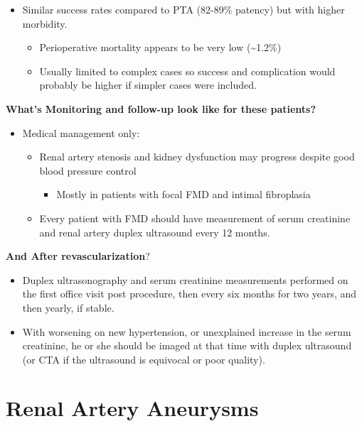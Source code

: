 \documentclass[
]{book}
\providecommand{\tightlist}{%
  \setlength{\itemsep}{0pt}\setlength{\parskip}{0pt}}
\begin{document}
\begin{itemize}
\item
  Similar success rates compared to PTA (82-89\% patency) but with
  higher morbidity.

  \begin{itemize}
  \item
    Perioperative mortality appears to be very low (\textasciitilde1.2\%)
  \item
    Usually limited to complex cases so success and complication
    would probably be higher if simpler cases were included.
  \end{itemize}
\end{itemize}

\textbf{What's Monitoring and follow-up look like for these patients?}

\begin{itemize}
\item
  Medical management only:

  \begin{itemize}
  \item
    Renal artery stenosis and kidney dysfunction may progress
    despite good blood pressure control

    \begin{itemize}
    \tightlist
    \item
      Mostly in patients with focal FMD and intimal fibroplasia
    \end{itemize}
  \item
    Every patient with FMD should have measurement of serum
    creatinine and renal artery duplex ultrasound every 12 months.
  \end{itemize}
\end{itemize}

\textbf{And After revascularization}?

\begin{itemize}
\item
  Duplex ultrasonography and serum creatinine measurements performed
  on the first office visit post procedure, then every six months for
  two years, and then yearly, if stable.
\item
  With worsening on new hypertension, or unexplained increase in the
  serum creatinine, he or she should be imaged at that time with
  duplex ultrasound (or CTA if the ultrasound is equivocal or poor
  quality).
\end{itemize}

\hypertarget{renal-artery-aneurysms}{%
\section{Renal Artery Aneurysms}\label{renal-artery-aneurysms}}
\end{document}
